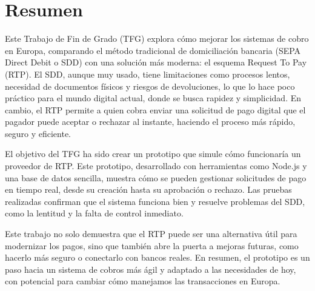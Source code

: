 {}

\thispagestyle{empty}
\section*{Resumen}

Este Trabajo de Fin de Grado (TFG) explora cómo mejorar los sistemas de cobro en Europa, comparando el método tradicional de domiciliación bancaria (SEPA Direct Debit o SDD) con una solución más moderna: el esquema Request To Pay (RTP). El SDD, aunque muy usado, tiene limitaciones como procesos lentos, necesidad de documentos físicos y riesgos de devoluciones, lo que lo hace poco práctico para el mundo digital actual, donde se busca rapidez y simplicidad. En cambio, el RTP permite a quien cobra enviar una solicitud de pago digital que el pagador puede aceptar o rechazar al instante, haciendo el proceso más rápido, seguro y eficiente.

El objetivo del TFG ha sido crear un prototipo que simule cómo funcionaría un proveedor de RTP. Este prototipo, desarrollado con herramientas como Node.js y una base de datos sencilla, muestra cómo se pueden gestionar solicitudes de pago en tiempo real, desde su creación hasta su aprobación o rechazo. Las pruebas realizadas confirman que el sistema funciona bien y resuelve problemas del SDD, como la lentitud y la falta de control inmediato.

Este trabajo no solo demuestra que el RTP puede ser una alternativa útil para modernizar los pagos, sino que también abre la puerta a mejoras futuras, como hacerlo más seguro o conectarlo con bancos reales. En resumen, el prototipo es un paso hacia un sistema de cobros más ágil y adaptado a las necesidades de hoy, con potencial para cambiar cómo manejamos las transacciones en Europa.

